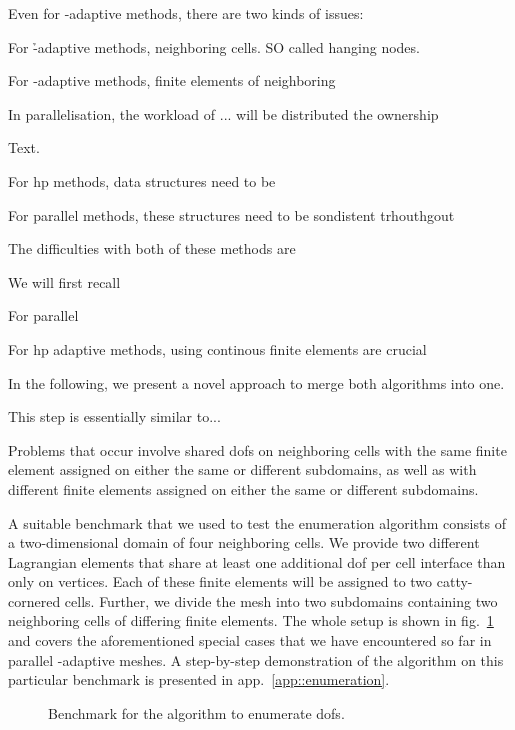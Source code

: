 Even for \hp-adaptive methods, there are two kinds of issues:

For \h-adaptive methods, neighboring cells. SO called hanging nodes.

For \p-adaptive methods, finite elements of neighboring 

In parallelisation, the workload of ... will be distributed the ownership




Text.


For hp methods, data structures need to be 

For parallel methods, these structures need to be sondistent trhouthgout

The difficulties with both of these methods are

We will first recall

For parallel


For hp adaptive methods, using continous finite elements are crucial

In the following, we present a novel approach to merge both algorithms into one.



This step is essentially similar to...


Problems that occur involve shared \glspl{dof} on neighboring cells with the same finite element assigned on either the same or different subdomains, as well as with different finite elements assigned on either the same or different subdomains.

A suitable benchmark that we used to test the enumeration algorithm consists of a two-dimensional domain of four neighboring cells. We provide two different Lagrangian elements that share at least one additional \gls{dof} per cell interface than only on vertices. Each of these finite elements will be assigned to two catty-cornered cells. Further, we divide the mesh into two subdomains containing two neighboring cells of differing finite elements. The whole setup is shown in fig.~\ref{fig:enumbenchmark} and covers the aforementioned special cases that we have encountered so far in parallel \hp-adaptive meshes. A step-by-step demonstration of the algorithm on this particular benchmark is presented in app.~\ref{app::enumeration}.

\begin{figure}
  \centering
  \caption{Benchmark for the algorithm to enumerate \glspl{dof}.}
  \label{fig:enumbenchmark}
\end{figure}

